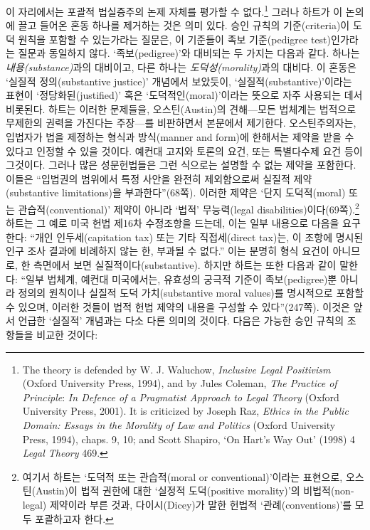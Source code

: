 \documentclass[12pt, oneside]{book}  %
\begin{document}
이 자리에서는 포괄적 법실증주의 논제 자체를 평가할 수 없다.\footnote{The
  theory is defended by W. J. Waluchow, \emph{Inclusive Legal
  Positivism} (Oxford University Press, 1994), and by Jules Coleman,
  \emph{The Practice of Principle}: \emph{In Defence of a Pragmatist
  Approach to Legal Theory} (Oxford University Press, 2001). It is
  criticized by Joseph Raz, \emph{Ethics in the Public Domain: Essays in
  the Morality of Law and Politics} (Oxford University Press, 1994),
  chaps. 9, 10; and Scott Shapiro, `On Hart's Way Out' (1998) 4
  \emph{Legal Theory} 469.} 그러나 하트가 이 논의에 끌고 들어온 혼동
하나를 제거하는 것은 의미 있다. 승인 규칙의 기준(criteria)이 도덕 원칙을
포함할 수 있는가라는 질문은, 이 기준들이 족보 기준(pedigree
test)인가라는 질문과 동일하지 않다. `족보(pedigree)'와 대비되는 두
가지는 다음과 같다. 하나는 \emph{내용(substance)}과의 대비이고, 다른
하나는 \emph{도덕성(morality)}과의 대비다. 이 혼동은 `실질적
정의(substantive justice)' 개념에서 보았듯이,
`실질적(substantive)'이라는 표현이 `정당화된(justified)' 혹은
`도덕적인(moral)'이라는 뜻으로 자주 사용되는 데서 비롯된다. 하트는
이러한 문제들을, 오스틴(Austin)의 견해---모든 법체계는 법적으로 무제한의
권력을 가진다는 주장---를 비판하면서 본문에서 제기한다. 오스틴주의자는,
입법자가 법을 제정하는 형식과 방식(manner and form)에 한해서는 제약을
받을 수 있다고 인정할 수 있을 것이다. 예컨대 고지와 토론의 요건, 또는
특별다수제 요건 등이 그것이다. 그러나 많은 성문헌법들은 그런 식으로는
설명할 수 없는 제약을 포함한다. 이들은 ``입법권의 범위에서 특정 사안을
완전히 제외함으로써 실질적 제약(substantive limitations)을
부과한다''(68쪽). 이러한 제약은 `단지 도덕적(moral) 또는
관습적(conventional)' 제약이 아니라 `법적' 무능력(legal
disabilities)이다(69쪽).\footnote{여기서 하트는 `도덕적 또는
  관습적(moral or conventional)'이라는 표현으로, 오스틴(Austin)이 법적
  권한에 대한 `실정적 도덕(positive morality)'의 비법적(non-legal)
  제약이라 부른 것과, 다이시(Dicey)가 말한 헌법적 `관례(conventions)'를
  모두 포괄하고자 한다.} 하트는 그 예로 미국 헌법 제16차 수정조항을
드는데, 이는 일부 내용으로 다음을 요구한다: ``개인 인두세(capitation
tax) 또는 기타 직접세(direct tax)는, 이 조항에 명시된 인구 조사 결과에
비례하지 않는 한, 부과될 수 없다.'' 이는 분명히 형식 요건이 아니므로, 한
측면에서 보면 실질적이다(substantive). 하지만 하트는 또한 다음과 같이
말한다: ``일부 법체계, 예컨대 미국에서는, 유효성의 궁극적 기준이
족보(pedigree)뿐 아니라 정의의 원칙이나 실질적 도덕 가치(substantive
moral values)를 명시적으로 포함할 수 있으며, 이러한 것들이 법적 헌법
제약의 내용을 구성할 수 있다''(247쪽). 이것은 앞서 언급한 `실질적'
개념과는 다소 다른 의미의 것이다. 다음은 가능한 승인 규칙의 조항들을
비교한 것이다:
\end{document}
